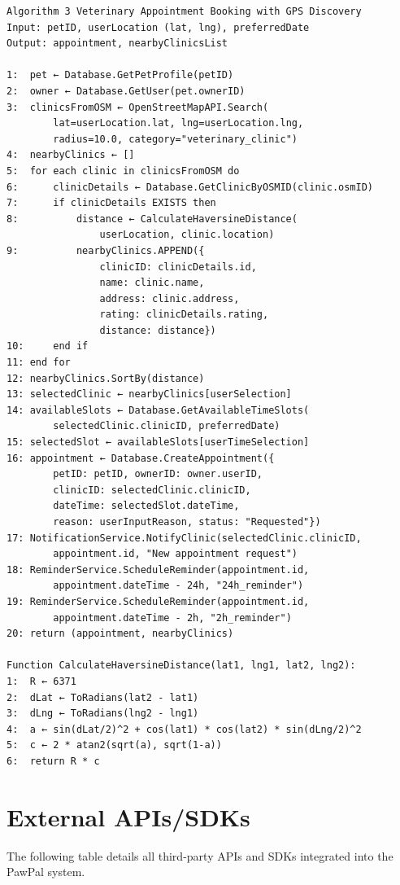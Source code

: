 \begin{verbatim}
Algorithm 3 Veterinary Appointment Booking with GPS Discovery
Input: petID, userLocation (lat, lng), preferredDate
Output: appointment, nearbyClinicsList

1:  pet ← Database.GetPetProfile(petID)
2:  owner ← Database.GetUser(pet.ownerID)
3:  clinicsFromOSM ← OpenStreetMapAPI.Search(
        lat=userLocation.lat, lng=userLocation.lng,
        radius=10.0, category="veterinary_clinic")
4:  nearbyClinics ← []
5:  for each clinic in clinicsFromOSM do
6:      clinicDetails ← Database.GetClinicByOSMID(clinic.osmID)
7:      if clinicDetails EXISTS then
8:          distance ← CalculateHaversineDistance(
                userLocation, clinic.location)
9:          nearbyClinics.APPEND({
                clinicID: clinicDetails.id,
                name: clinic.name,
                address: clinic.address,
                rating: clinicDetails.rating,
                distance: distance})
10:     end if
11: end for
12: nearbyClinics.SortBy(distance)
13: selectedClinic ← nearbyClinics[userSelection]
14: availableSlots ← Database.GetAvailableTimeSlots(
        selectedClinic.clinicID, preferredDate)
15: selectedSlot ← availableSlots[userTimeSelection]
16: appointment ← Database.CreateAppointment({
        petID: petID, ownerID: owner.userID,
        clinicID: selectedClinic.clinicID,
        dateTime: selectedSlot.dateTime,
        reason: userInputReason, status: "Requested"})
17: NotificationService.NotifyClinic(selectedClinic.clinicID,
        appointment.id, "New appointment request")
18: ReminderService.ScheduleReminder(appointment.id,
        appointment.dateTime - 24h, "24h_reminder")
19: ReminderService.ScheduleReminder(appointment.id,
        appointment.dateTime - 2h, "2h_reminder")
20: return (appointment, nearbyClinics)

Function CalculateHaversineDistance(lat1, lng1, lat2, lng2):
1:  R ← 6371
2:  dLat ← ToRadians(lat2 - lat1)
3:  dLng ← ToRadians(lng2 - lng1)
4:  a ← sin(dLat/2)^2 + cos(lat1) * cos(lat2) * sin(dLng/2)^2
5:  c ← 2 * atan2(sqrt(a), sqrt(1-a))
6:  return R * c
\end{verbatim}

\section{External APIs/SDKs}

The following table details all third-party APIs and SDKs integrated into the PawPal system.

